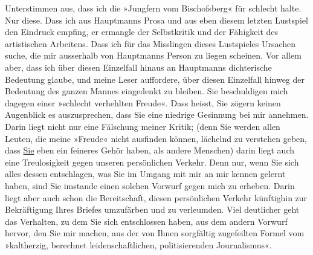 \begin{ledgroupsized}[t]{13cm}
               Unterstimmen aus, dass ich die »Jungfern vom
                  Bischofsberg« für schlecht halte. Nur diese. Dass ich aus Hauptmanns Prosa und aus eben diesem letzten Lustspiel den
               Eindruck empfing, er ermangle der Selbstkritik und der Fähigkeit des artistischen
               Arbeitens. Dass ich für das Misslingen dieses Lustspieles Ursachen suche, die mir
               ausserhalb von Hauptmanns Person zu liegen
               scheinen. Vor allem aber, dass ich über diesen Einzelfall hinaus an Hauptmanns dichterische Bedeutung glaube, und meine Leser
               auffordere, über diesen Einzelfall hinweg der Bedeutung des ganzen Mannes eingedenkt
               zu bleiben.\pend
           \pstart
           Sie beschuldigen mich dagegen einer »schlecht verhehlten Freude«. Dass heisst, Sie
               zögern keinen Augenblick es auszusprechen, dass Sie eine
               niedrige Gesinnung bei mir annehmen. Darin liegt nicht nur eine Fälschung meiner
               Kritik; (denn Sie werden allen Leuten, die meine »Freude« nicht ausfinden können,
               lächelnd zu verstehen geben, dass \uline{Sie} eben ein
               feineres Gehör haben, als andere Menschen) darin liegt auch eine Treulosigkeit gegen
               unseren persönlichen Verkehr. Denn nur, wenn Sie sich alles dessen entschlagen, was
               Sie im Umgang mit mir an mir kennen gelernt haben, sind Sie imstande einen solchen
               Vorwurf gegen mich zu erheben. Darin liegt aber auch schon die Bereitschaft, diesen
               persönlichen Verkehr künftighin zur Bekräftigung Ihres Briefes umzufärben und zu
               verleumden.\pend
           \pstart
           Viel deutlicher geht das Verhalten, zu dem Sie sich entschlossen haben, aus dem
               andern Vorwurf hervor, den Sie mir machen, aus der von Ihnen sorgfältig zugefeilten
               Formel vom »kaltherzig, berechnet leidenschaftlichen, politisierenden Journalismus«.

\end{ledgroupsized}
